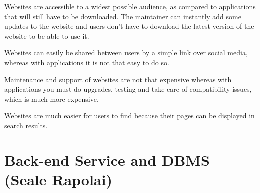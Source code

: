 \documentclass[11pt]{article}
\begin{document}
			\begin{flushleft}
				Websites are accessible to a widest possible audience, as compared to applications that will still have to be downloaded. The maintainer can instantly add some updates to the website and users don’t have to download the latest version of the website to be able to use it.
			\end{flushleft}
			
			\begin{flushleft}
				Websites can easily be shared between users by a simple link over social media, whereas with applications it is not that easy to do so.
			\end{flushleft}
			
			\begin{flushleft}
				Maintenance and support of websites are not that expensive whereas with applications you must do upgrades, testing and take care of compatibility issues, which is much more expensive.
			\end{flushleft}
			
			\begin{flushleft}
				Websites are much easier for users to find because their pages can be displayed in search results.
			\end{flushleft}
	\section{Back-end Service and DBMS (Seale Rapolai)}
	
\end{document}
